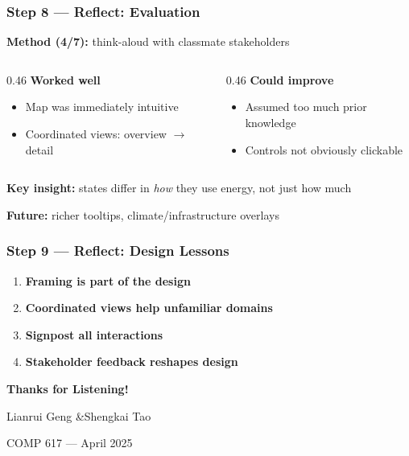 \documentclass{beamer}
\begin{document}
\begin{frame}
    \frametitle{Step 8 --- Reflect: Evaluation}

    \textbf{Method (4/7):} think-aloud with classmate stakeholders

    \bigskip

    \begin{columns}[T]
        \begin{column}{0.46\textwidth}
            \textbf{Worked well}
            \begin{itemize}
                \item Map was immediately intuitive
                \item Coordinated views: overview $\rightarrow$ detail
            \end{itemize}
        \end{column}
        \begin{column}{0.46\textwidth}
            \textbf{Could improve}
            \begin{itemize}
                \item Assumed too much prior knowledge
                \item Controls not obviously clickable
            \end{itemize}
        \end{column}
    \end{columns}

    \bigskip

    \textbf{Key insight:} states differ in \emph{how} they use energy, not just how much

    \medskip

    \textbf{Future:} richer tooltips, climate/infrastructure overlays
\end{frame}


\begin{frame}
    \frametitle{Step 9 --- Reflect: Design Lessons}

    \begin{enumerate}
        \item \textbf{Framing is part of the design}

        \bigskip
        \bigskip

        \item \textbf{Coordinated views help unfamiliar domains}

        \bigskip
        \bigskip

        \item \textbf{Signpost all interactions}

        \bigskip
        \bigskip

        \item \textbf{Stakeholder feedback reshapes design}
    \end{enumerate}
\end{frame}


\begin{frame}
    \centering

    \vspace{2cm}

    {\LARGE \textbf{Thanks for Listening!}}

    \bigskip
    \bigskip

    Lianrui Geng \quad\&\quad Shengkai Tao

    \medskip

    \small COMP 617 --- April 2025
\end{frame}
\end{document}
